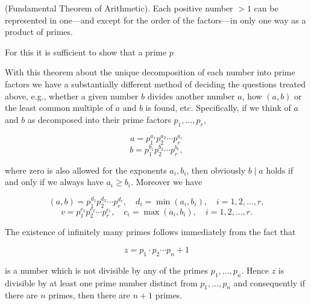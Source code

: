 (Fundamental Theorem of Arithmetic). Each positive number $> 1$ can be represented in one—and except for the order of the factors—in only one way as a product of primes.

For this it is sufficient to show that a prime $p$

With this theorem about the unique decomposition of each number into prime factors we have a substantially different method of deciding the questions treated above, e.g., whether a given number $b$ divides another number $a$, how $(a, b)$ or the least common multiple of $a$ and $b$ is found, etc. Specifically, if we think of $a$ and $b$ as decomposed into their prime factors $p_1, \ldots, p_r$,

$$a = p_1^{a_1} p_2^{a_2} \cdots p_r^{a_r}$$
$$b = p_1^{b_1} p_2^{b_2} \cdots p_r^{b_r},$$

where zero is also allowed for the exponents $a_i, b_i$, then obviously $b \mid a$ holds if and only if we always have $a_i \geq b_i$. Moreover we have

$$(a, b) = p_1^{d_1} p_2^{d_2} \cdots p_r^{d_r}, \quad d_i = \min(a_i, b_i), \quad i = 1, 2, \ldots, r,$$
$$v = p_1^{c_1} p_2^{c_2} \cdots p_r^{c_r}, \quad c_i = \max(a_i, b_i), \quad i = 1, 2, \ldots, r.$$

The existence of infinitely many primes follows immediately from the fact that

$$z = p_1 \cdot p_2 \cdots p_n + 1$$

is a number which is not divisible by any of the primes $p_1, \ldots, p_n$. Hence $z$ is divisible by at least one prime number distinct from $p_1, \ldots, p_n$ and consequently if there are $n$ primes, then there are $n + 1$ primes.
